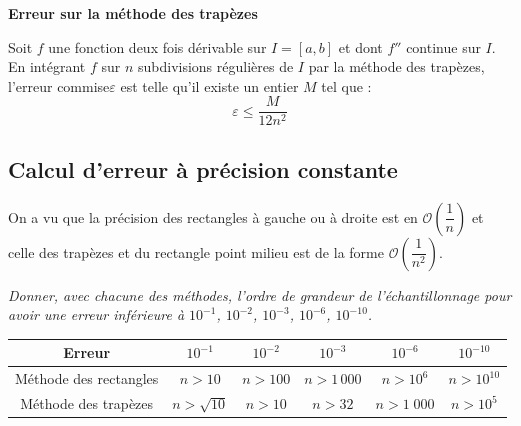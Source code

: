 \documentclass[10pt]{article}
\begin{document}
\begin{resultat}
\textbf{Erreur sur la méthode des trapèzes}

Soit $f$ une fonction deux fois dérivable sur $I=[a,b]$ et dont $f''$ continue sur $I$. %
En intégrant $f$ sur $n$ subdivisions régulières de $I$ par la méthode des trapèzes, l'erreur commise$\varepsilon$ est telle qu'il existe un entier $M$ tel que : 
$$ \varepsilon \leq \dfrac{M}{12n^2}$$ 

\end{resultat}

\subsection{Calcul d'erreur à précision constante}

On a vu que la précision des rectangles à gauche ou à droite est en $\mathcal{O}\left(\dfrac{1}{n}\right)$ et celle des trapèzes et du rectangle point milieu est de la forme $\mathcal{O}\left(\dfrac{1}{n^2}\right)$.

\begin{exemple}
\textit{Donner, avec chacune des méthodes, l'ordre de grandeur de l'échantillonnage pour avoir une erreur inférieure à $10^{-1}$, $10^{-2}$, $10^{-3}$, $10^{-6}$, $10^{-10}$. }
\begin{center}
\begin{tabular}{|c|c|c|c|c|c|}
\hline
Erreur & $10^{-1}$ & $10^{-2}$ & $10^{-3}$ & $10^{-6}$ & $10^{-10}$ \\
\hline
\hline
Méthode des rectangles & $n>10$ & $n>100$ & $n>1\,000$ & $n>10^6$ & $n>10^{10}$  \\
\hline
Méthode des trapèzes & $n>\sqrt{10}$ & $n>10$ & $n>32$ & $n>1\;000$ & $n>10^5$ \\
\hline
\end{tabular}
\end{center}
\end{exemple}
 

\begin{thebibliography}{2}
\end{thebibliography}
\end{document}
